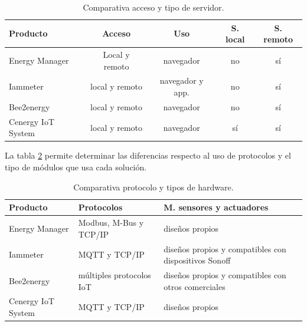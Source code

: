\begin{table}[h]
	\centering
	\caption[Comparativa de soluciones entre acceso y servidor]{Comparativa acceso y tipo de servidor.}
	\begin{tabular}{l c c c c }    
		\toprule
		\textbf{Producto} & \textbf{Acceso}  & \textbf{Uso} & \textbf{S. local}   & \textbf{S. remoto} \\
		\midrule
		Energy Manager & Local y remoto 	& navegador & no & sí  \\		
		Iammeter	 & local y remoto	& navegador y app. & no & sí  \\
		Bee2energy	 & local y remoto	& navegador & no & sí  \\
		\rowcolor[HTML]{ebedef}Cenergy IoT System & local y remoto& navegador & sí & sí \\
		\bottomrule
		\hline
	\end{tabular}
	\label{tab:tabla-resultado}
\end{table}


La tabla \ref{tab:tabla-resultado2} permite determinar las diferencias respecto al uso de protocolos y el tipo de módulos que usa cada solución. 


\begin{table}[h]
	\centering
	\caption[Comparativa de soluciones entre protocolo y hardware]{Comparativa protocolo y tipos de hardware.}
	\begin{tabular}{l p{5cm} p{5cm}}    
		\toprule
		\textbf{Producto} 	 & \textbf{Protocolos}  & \textbf{M. sensores y actuadores}  \\
		\midrule
		Energy Manager & Modbus, M-Bus y TCP/IP 	& diseños propios \\		
		Iammeter	 & MQTT y TCP/IP	&diseños propios y compatibles con       dispositivos Sonoff   \\
		Bee2energy	 & múltiples protocolos IoT		& diseños propios y compatibles con otros comerciales  \\
		\rowcolor[HTML]{ebedef}Cenergy IoT	System & MQTT y TCP/IP		&diseños propios  \\
		\bottomrule
		\hline
	\end{tabular}
	\label{tab:tabla-resultado2}
\end{table}
